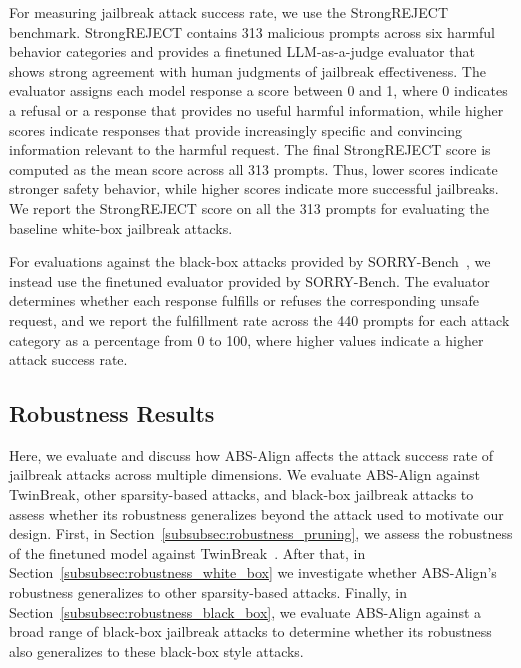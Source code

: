 For measuring jailbreak attack success rate, we use the StrongREJECT~\cite{souly2024strongreject} benchmark. StrongREJECT contains 313 malicious prompts across six harmful behavior categories and provides a finetuned LLM-as-a-judge evaluator that shows strong agreement with human judgments of jailbreak effectiveness. The evaluator assigns each model response a score between 0 and 1, where 0 indicates a refusal or a response that provides no useful harmful information, while higher scores indicate responses that provide increasingly specific and convincing information relevant to the harmful request. The final StrongREJECT score is computed as the mean score across all 313 prompts. Thus, lower scores indicate stronger safety behavior, while higher scores indicate more successful jailbreaks. We report the StrongREJECT score on all the 313 prompts for evaluating the baseline white-box jailbreak attacks.

For evaluations against the black-box attacks provided by SORRY-Bench~\cite{xie2025sorrybench}, we instead use the finetuned evaluator provided by SORRY-Bench. The evaluator determines whether each response fulfills or refuses the corresponding unsafe request, and we report the fulfillment rate across the 440 prompts for each attack category as a percentage from 0 to 100, where higher values indicate a higher attack success rate.




\subsection{Robustness Results}
\label{subsec:robustness_results}

Here, we evaluate and discuss how ABS-Align affects the attack success rate of jailbreak attacks across multiple dimensions. We evaluate ABS-Align against TwinBreak, other sparsity-based attacks, and black-box jailbreak attacks to assess whether its robustness generalizes beyond the attack used to motivate our design. First, in Section~\ref{subsubsec:robustness_pruning}, we assess the robustness of the finetuned model against TwinBreak~\cite{twinbreak}. After that, in Section~\ref{subsubsec:robustness_white_box} we investigate whether ABS-Align's robustness generalizes to other sparsity-based attacks. Finally, in Section~\ref{subsubsec:robustness_black_box}, we evaluate ABS-Align against a broad range of black-box jailbreak attacks to determine whether its robustness also generalizes to these black-box style attacks.

